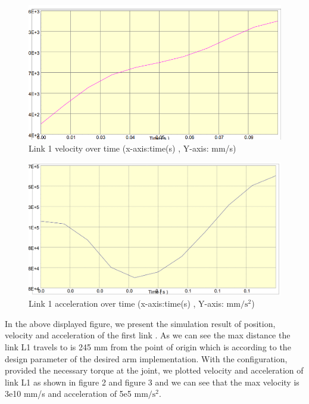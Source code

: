 \begin{figure}
    \centering
    \includegraphics[width=1\linewidth]{inventor/L1_velocity.png}
    \caption{Link 1 velocity over time (x-axis:time(s) , Y-axis: mm/s) }
    \label{fig:enter-label}
\end{figure}
\begin{figure}
    \centering
    \includegraphics[width=1\linewidth]{inventor/L1_acceleration.png}
    \caption{Link 1 acceleration over time (x-axis:time(s) , Y-axis: $\mathrm{mm/s^2}$) }
    \label{fig:enter-label}
\end{figure}
In the above displayed figure, we present the simulation result  of position, velocity and acceleration of the first link . As we can see the max distance the link L1 travels to is 245 mm from the point of origin which is according to the design parameter of the desired arm implementation. With the configuration, provided the necessary torque at the joint, we plotted velocity and acceleration of link L1 as shown in figure 2 and figure 3 and we can see that the max velocity is 3e10 mm/s and acceleration of  5e5 $\mathrm{mm/s^2}$.  
  
